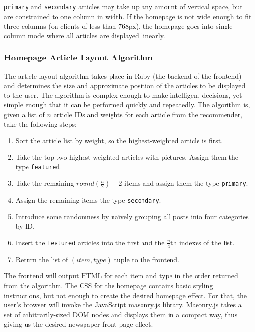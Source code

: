 \documentclass[11pt,letterpaper,titlepage]{article}
\begin{document}
\verb+primary+ and \verb+secondary+ articles may take up any amount of vertical space, but are constrained to one column in width.
If the homepage is not wide enough to fit three columns (on clients of less than 768px), the homepage goes into single-column mode where all articles are displayed linearly.

\subsubsection{Homepage Article Layout Algorithm}
The article layout algorithm takes place in Ruby (the backend of the frontend) and determines the size and approximate position of the articles to be displayed to the user.
The algorithm is complex enough to make intelligent decisions, yet simple enough that it can be performed quickly and repeatedly.
The algorithm is, given a list of $n$ article IDs and weights for each article from the recommender, take the following steps:

\begin{enumerate}
\item Sort the article list by weight, so the highest-weighted article is first.
\item Take the top two highest-weighted articles with pictures. Assign them the type \verb+featured+.
\item Take the remaining $round(\frac{n}{2}) - 2$ items and assign them the type \verb+primary+.
\item Assign the remaining items the type \verb+secondary+.
\item Introduce some randomness by na\"{i}vely grouping all posts into four categories by ID.
\item Insert the \verb+featured+ articles into the first and the $\frac{n}{4}$th indexes of the list.
\item Return the list of $(item, type)$ tuple to the frontend.
\end{enumerate}

The frontend will output HTML for each item and type in the order returned from the algorithm.
The CSS for the homepage contains basic styling instructions, but not enough to create the desired homepage effect.
For that, the user's browser will invoke the JavaScript masonry.js library\cite{masonry}.
Masonry.js takes a set of arbitrarily-sized DOM nodes and displays them in a compact way, thus giving us the desired newspaper front-page effect.
\end{document}
